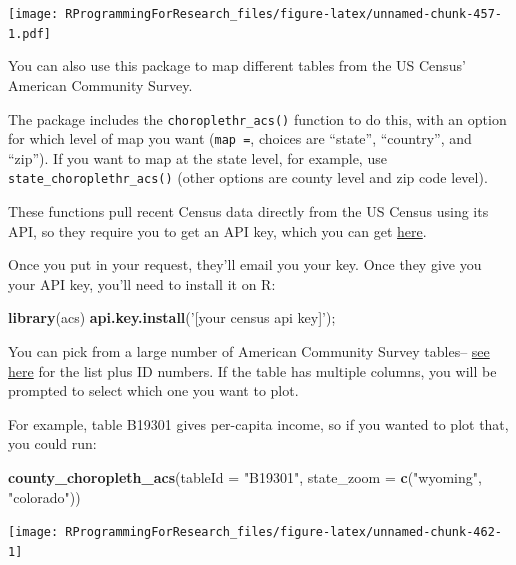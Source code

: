 \documentclass[]{book}
\makeatletter
\newenvironment{Shaded}{\begin{snugshade}}{\end{snugshade}}
\newcommand{\KeywordTok}[1]{\textcolor[rgb]{0.13,0.29,0.53}{\textbf{{#1}}}}
\newcommand{\DataTypeTok}[1]{\textcolor[rgb]{0.13,0.29,0.53}{{#1}}}
\newcommand{\StringTok}[1]{\textcolor[rgb]{0.31,0.60,0.02}{{#1}}}
\newcommand{\NormalTok}[1]{{#1}}
\newenvironment{kframe}{%
\medskip{}
\setlength{\fboxsep}{.8em}
 \def\at@end@of@kframe{}%
 \ifinner\ifhmode%
  \def\at@end@of@kframe{\end{minipage}}%
  \begin{minipage}{\columnwidth}%
 \fi\fi%
 \def\FrameCommand##1{\hskip\@totalleftmargin \hskip-\fboxsep
 \colorbox{shadecolor}{##1}\hskip-\fboxsep
     \hskip-\linewidth \hskip-\@totalleftmargin \hskip\columnwidth}%
 \MakeFramed {\advance\hsize-\width
   \@totalleftmargin\z@ \linewidth\hsize
   \@setminipage}}%
 {\par\unskip\endMakeFramed%
 \at@end@of@kframe}
\renewenvironment{Shaded}{\begin{kframe}}{\end{kframe}}
\makeatother
\begin{document}
\texttt{[image: RProgrammingForResearch\_files/figure-latex/unnamed-chunk-457-1.pdf]}

You can also use this package to map different tables from the US
Census' American Community Survey.

The package includes the \texttt{choroplethr\_acs()} function to do
this, with an option for which level of map you want (\texttt{map\ =},
choices are ``state'', ``country'', and ``zip''). If you want to map at
the state level, for example, use \texttt{state\_choroplethr\_acs()}
(other options are county level and zip code level).

These functions pull recent Census data directly from the US Census
using its API, so they require you to get an API key, which you can get
\href{http://api.census.gov/data/key_signup.html}{here}. \bigskip

Once you put in your request, they'll email you your key. Once they give
you your API key, you'll need to install it on R:

\begin{Shaded}
\begin{Highlighting}[]
\KeywordTok{library}\NormalTok{(acs)}
\KeywordTok{api.key.install}\NormalTok{(}\StringTok{'[your census api key]'}\NormalTok{);}
\end{Highlighting}
\end{Shaded}

You can pick from a large number of American Community Survey tables--
\href{http://factfinder.census.gov/faces/affhelp/jsf/pages/metadata.xhtml?lang=en\&type=dataset\&id=dataset.en.ACS_12_5YR}{see
here} for the list plus ID numbers. If the table has multiple columns,
you will be prompted to select which one you want to plot.

For example, table B19301 gives per-capita income, so if you wanted to
plot that, you could run:

\begin{Shaded}
\begin{Highlighting}[]
\KeywordTok{county_choropleth_acs}\NormalTok{(}\DataTypeTok{tableId =} \StringTok{"B19301"}\NormalTok{,}
                       \DataTypeTok{state_zoom =} \KeywordTok{c}\NormalTok{(}\StringTok{"wyoming"}\NormalTok{,}
                                      \StringTok{"colorado"}\NormalTok{))}
\end{Highlighting}
\end{Shaded}

\begin{center}\texttt{[image: RProgrammingForResearch\_files/figure-latex/unnamed-chunk-462-1]} \end{center}
\end{document}
